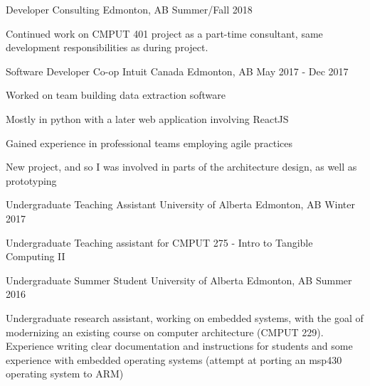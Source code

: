 
\begin{cventries}
  \cventry
    {Developer} %
    {Consulting} %
    {Edmonton, AB} %
    {Summer/Fall 2018} %
    {
      \begin{cvitems} %
      \item {Continued work on CMPUT 401 project as a part-time consultant, same development responsibilities as during project.}
      \end{cvitems}
    }

  \cventry
    {Software Developer Co-op} %
    {Intuit Canada} %
    {Edmonton, AB} %
    {May 2017 - Dec 2017} %
    {
      \begin{cvitems} %
      \item {Worked on team building data extraction software}
      \item {Mostly in python with a later web application involving ReactJS}
      \item {Gained experience in professional teams employing agile practices}
      \item {New project, and so I was involved in parts of the architecture design, as well as prototyping}
      \end{cvitems}
    }

  \cventry
    {Undergraduate Teaching Assistant} %
    {University of Alberta} %
    {Edmonton, AB} %
    {Winter 2017} %
    {
      \begin{cvitems} %
      \item {Undergraduate Teaching assistant for CMPUT 275 - Intro to Tangible Computing II}
      \end{cvitems}
    }

  \cventry
    {Undergraduate Summer Student} %
    {University of Alberta} %
    {Edmonton, AB} %
    {Summer 2016} %
    {
      \begin{cvitems} %
      \item {Undergraduate research assistant, working on embedded systems, with the goal of modernizing an existing course on computer architecture (CMPUT 229). Experience writing clear documentation and instructions for students and some experience with embedded operating systems (attempt at porting an msp430 operating system to ARM)}
      \end{cvitems}
    }


\end{cventries}
